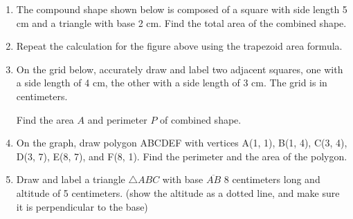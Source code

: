 \begin{enumerate}
  \item The compound shape shown below is composed of a square with side length 5 cm and a triangle with base 2 cm. Find the total area of the combined shape.
    \vspace{1cm} 
    \begin{flushleft}
    \end{flushleft} \vspace{1cm}
  \item Repeat the calculation for the figure above using the trapezoid area formula. \vspace{1cm}
  
  \item On the grid below, accurately draw and label two adjacent squares, one with a side length of 4 cm, the other with a side length of 3 cm. The grid is in centimeters. \par \medskip
    Find the area $A$ and perimeter $P$ of combined shape.
    \begin{flushleft}
    \end{flushleft}
  
  \item On the graph, draw polygon ABCDEF with vertices A(1, 1), B(1, 4), C(3, 4), D(3, 7), E(8, 7), and F(8, 1). Find the perimeter and the area of the polygon.
  \begin{flushleft}
    \end{flushleft}
  
  \item Draw and label a triangle $\triangle ABC$ with base $\overline{AB}$ 8 centimeters long and altitude of 5 centimeters. (show the altitude as a dotted line, and make sure it is perpendicular to the base) 
  
  

\end{enumerate}
